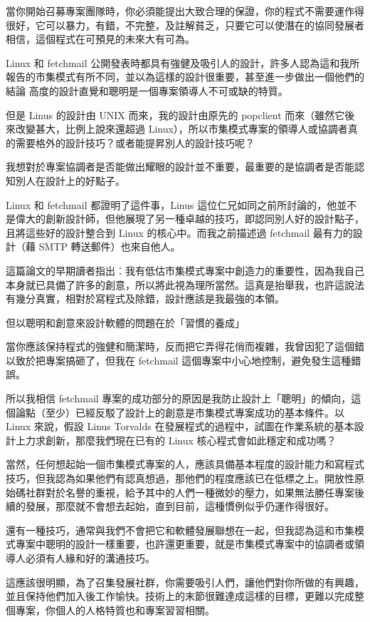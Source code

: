\documentclass[12pt,]{article}
\makeatletter
\newcommand*{\shifttext}[2]{%
  \settowidth{\@tempdima}{#2}%
  \makebox[\@tempdima]{\hspace*{#1}#2}%
}
\makeatother
\begin{document}
當你開始召募專案團隊時，你必須能提出大致合理的保證，你的程式不需要運作得很好，它可以暴力，有錯，不完整，及註解貧乏，只要它可以使潛在的協同發展者相信，這個程式在可預見的未來大有可為。

Linux 和 fetchmail
公開發表時都具有強健及吸引人的設計，許多人認為這和我所報告的市集模式有所不同，並以為這樣的設計很重要，甚至進一步做出一個他們的結論
\shifttext{1pt}{---}\shifttext{-1pt}{---} 高度的設計直覺和聰明是一個專案領導人不可或缺的特質。

但是 Linus 的設計由 UNIX 而來，我的設計由原先的 popclient
而來（雖然它後來改變甚大，比例上說來還超過
Linux），所以市集模式專案的領導人或協調者真的需要格外的設計技巧？或者能提昇別人的設計技巧呢？

我想對於專案協調者是否能做出耀眼的設計並不重要，最重要的是協調者是否能認知別人在設計上的好點子。

Linux 和 fetchmail 都證明了這件事，Linus
這位仁兄如同之前所討論的，他並不是偉大的創新設計師，但他展現了另一種卓越的技巧，即認同別人好的設計點子，且將這些好的設計整合到
Linux 的核心中。而我之前描述過 fetchmail 最有力的設計（藉 SMTP
轉送郵件）也來自他人。

這篇論文的早期讀者指出︰我有低估市集模式專案中創造力的重要性，因為我自己本身就已具備了許多的創意，所以將此視為理所當然。這真是抬舉我，也許這說法有幾分真實，相對於寫程式及除錯，設計應該是我最強的本領。

但以聰明和創意來設計軟體的問題在於「習慣的養成」 \shifttext{1pt}{---}\shifttext{-1pt}{---}
當你應該保持程式的強健和簡潔時，反而把它弄得花俏而複雜，我曾因犯了這個錯以致於把專案搞砸了，但我在
fetchmail 這個專案中小心地控制，避免發生這種錯誤。

所以我相信 fetchmail
專案的成功部分的原因是我防止設計上「聰明」的傾向，這個論點（至少）已經反駁了設計上的創意是市集模式專案成功的基本條件。以
Linux 來說，假設 Linus Torvalds
在發展程式的過程中，試圖在作業系統的基本設計上力求創新，那麼我們現在已有的
Linux 核心程式會如此穩定和成功嗎？

當然，任何想起始一個市集模式專案的人，應該具備基本程度的設計能力和寫程式技巧，但我認為如果他們有認真想過，那他們的程度應該已在低標之上。開放性原始碼社群對於名譽的重視，給予其中的人們一種微妙的壓力，如果無法勝任專案後續的發展，那麼就不會想去起始，直到目前，這種慣例似乎仍運作得很好。

還有一種技巧，通常與我們不會把它和軟體發展聯想在一起，但我認為這和市集模式專案中聰明的設計一樣重要，也許還更重要，就是市集模式專案中的協調者或領導人必須有人緣和好的溝通技巧。

這應該很明顯，為了召集發展社群，你需要吸引人們，讓他們對你所做的有興趣，並且保持他們加入後工作愉快。技術上的末節很難達成這樣的目標，更難以完成整個專案，你個人的人格特質也和專案習習相關。
\end{document}
